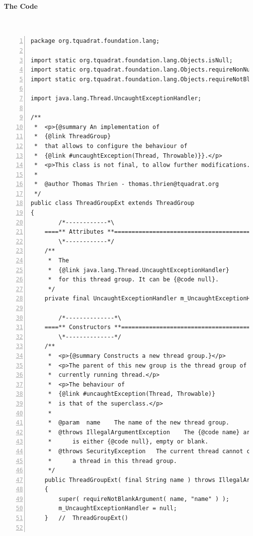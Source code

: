 \documentclass[11pt,a4paper, titlepage, parskip=half, headsepline, footsepline, cleardoublepage=current, headheight=1cm]{scrbook}
\begin{document}
\paragraph{The Code} \
\begin{lstlisting}[numbers=left,caption={ThreadGroupExt.java}]
package org.tquadrat.foundation.lang;

import static org.tquadrat.foundation.lang.Objects.isNull;
import static org.tquadrat.foundation.lang.Objects.requireNonNullArgument;
import static org.tquadrat.foundation.lang.Objects.requireNotBlankArgument;

import java.lang.Thread.UncaughtExceptionHandler;

/**
 *  <p>{@summary An implementation of
 *  {@link ThreadGroup}
 *  that allows to configure the behaviour of
 *  {@link #uncaughtException(Thread, Throwable)}}.</p>
 *  <p>This class is not final, to allow further modifications.</p>
 *
 *  @author Thomas Thrien - thomas.thrien@tquadrat.org
 */
public class ThreadGroupExt extends ThreadGroup
{
        /*------------*\
    ====** Attributes **=============================================
        \*------------*/
    /**
     *  The
     *  {@link java.lang.Thread.UncaughtExceptionHandler}
     *  for this thread group. It can be {@code null}.
     */
    private final UncaughtExceptionHandler m_UncaughtExceptionHandler;

        /*--------------*\
    ====** Constructors **===========================================
        \*--------------*/
    /**
     *  <p>{@summary Constructs a new thread group.}</p>
     *  <p>The parent of this new group is the thread group of the 
     *  currently running thread.</p>
     *  <p>The behaviour of
     *  {@link #uncaughtException(Thread, Throwable)}
     *  is that of the superclass.</p>
     *
     *  @param  name    The name of the new thread group.
     *  @throws IllegalArgumentException    The {@code name} argument
     *      is either {@code null}, empty or blank.
     *  @throws SecurityException   The current thread cannot create
     *      a thread in this thread group.
     */
    public ThreadGroupExt( final String name ) throws IllegalArgumentException
    {
        super( requireNotBlankArgument( name, "name" ) );
        m_UncaughtExceptionHandler = null;
    }   //  ThreadGroupExt()


\end{lstlisting}
\end{document}
